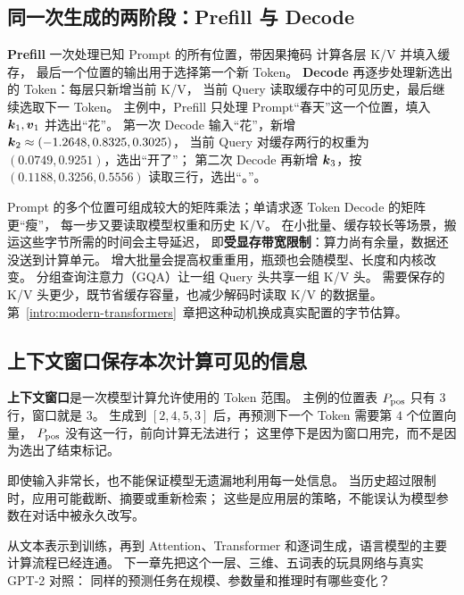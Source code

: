 \subsection{同一次生成的两阶段：Prefill 与 Decode}
\label{concept:prefill-decode}
\textbf{Prefill} 一次处理已知 Prompt 的所有位置，带因果掩码 计算各层 K/V 并填入缓存，
最后一个位置的输出用于选择第一个新 Token。
\textbf{Decode} 再逐步处理新选出的 Token：每层只新增当前 K/V，
当前 Query 读取缓存中的可见历史，最后继续选取下一 Token。
主例中，Prefill 只处理 Prompt“春天”这一个位置，填入 $\boldsymbol{k}_1,\boldsymbol{v}_1$ 并选出“花”。
第一次 Decode 输入“花”，新增 $\boldsymbol{k}_2\approx(-1.2648,0.8325,0.3025)$，
当前 Query 对缓存两行的权重为 $(0.0749,0.9251)$，选出“开了”；
第二次 Decode 再新增 $\boldsymbol{k}_3$，按 $(0.1188,0.3256,0.5556)$ 读取三行，选出“。”。

Prompt 的多个位置可组成较大的矩阵乘法；单请求逐 Token Decode 的矩阵更“瘦”，
每一步又要读取模型权重和历史 K/V。
在小批量、缓存较长等场景，搬运这些字节所需的时间会主导延迟，
即\textbf{受显存带宽限制}：算力尚有余量，数据还没送到计算单元。
增大批量会提高权重重用，瓶颈也会随模型、长度和内核改变。
\label{concept:gqa}
分组查询注意力（GQA）让一组 Query 头共享一组 K/V 头。
需要保存的 K/V 头更少，既节省缓存容量，也减少解码时读取 K/V 的数据量。
第~\ref*{intro:modern-transformers}~章把这种动机换成真实配置的字节估算。

\subsection{上下文窗口保存本次计算可见的信息}

\textbf{上下文窗口}是一次模型计算允许使用的 Token 范围。
主例的位置表 $P_{\rm pos}$ 只有 $3$ 行，窗口就是 $3$。
生成到 $[2,4,5,3]$ 后，再预测下一个 Token 需要第 $4$ 个位置向量，
$P_{\rm pos}$ 没有这一行，前向计算无法进行；
这里停下是因为窗口用完，而不是因为选出了结束标记。
\begin{boundarybox}
即使输入非常长，也不能保证模型无遗漏地利用每一处信息。
当历史超过限制时，应用可能截断、摘要或重新检索；
这些是应用层的策略，不能误认为模型参数在对话中被永久改写。
\end{boundarybox}



\par\smallskip
从文本表示到训练，再到 Attention、Transformer 和逐词生成，语言模型的主要计算流程已经连通。
下一章先把这个一层、三维、五词表的玩具网络与真实 GPT-2 对照：
同样的预测任务在规模、参数量和推理时有哪些变化？\label{route:generation-end}
